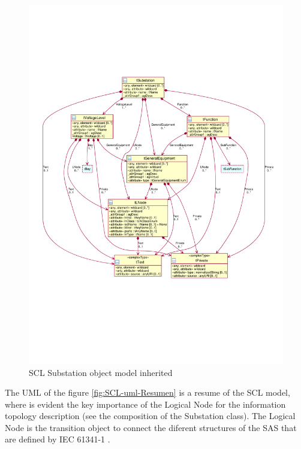\begin{figure}
  \includegraphics[width=1.0\linewidth]{chapters/ch-scl/figures/SCL-uml-substation-Deept2-inherited}
  \caption{SCL Substation object model inherited  }
  \label{fig:pdf-SCL-uml-substation-Deept2-inherited}
\end{figure}

The UML of the 
figure \ref{fig:SCL-uml-Resumen} 
is a resume of
the SCL model, where is evident the 
key importance of the Logical Node for  
the information topology description (see 
the composition of the Substation 
class). The Logical Node is  
the transition object to 
connect the diferent structures of the SAS 
that are defined by IEC 61341-1 \cite{IEC61346-1:1996}.


